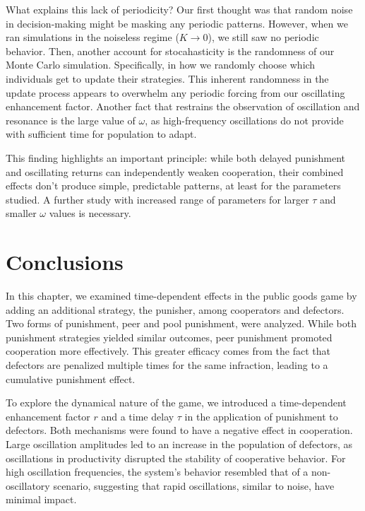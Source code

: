 What explains this lack of periodicity? Our first thought was that random noise in decision-making might be masking any periodic patterns. However, when we ran simulations in the noiseless regime ($K \to 0$), we still saw no periodic behavior. Then, another account for stocahasticity is the randomness of our Monte Carlo simulation. Specifically, in how we randomly choose which individuals get to update their strategies. This inherent randomness in the update process appears to overwhelm any periodic forcing from our oscillating enhancement factor. Another fact that restrains the observation of oscillation and resonance is the large value of $\omega$, as high-frequency oscillations do not provide with sufficient time for population to adapt. 

This finding highlights an important principle: while both delayed punishment and oscillating returns can independently weaken cooperation, their combined effects don't produce simple, predictable patterns, at least for the parameters studied. A further study with increased range of parameters for larger $\tau$ and smaller $\omega$ values is necessary.




\section{Conclusions }
\label{3Conclusions}


In this chapter, we examined time-dependent effects in the public goods game by adding an additional strategy, the punisher, among cooperators and defectors. Two forms of punishment, peer and pool punishment, were analyzed. While both punishment strategies yielded similar outcomes, peer punishment promoted cooperation more effectively. This greater efficacy comes from the fact that defectors are penalized multiple times for the same infraction, leading to a cumulative punishment effect.

To explore the dynamical nature of the game, we introduced a time-dependent enhancement factor $r$ and a time delay $\tau$ in the application of punishment to defectors. Both mechanisms were found to have a negative effect in cooperation. Large oscillation amplitudes led to an increase in the population of defectors, as oscillations in productivity disrupted the stability of cooperative behavior. For high oscillation frequencies, the system's behavior resembled that of a non-oscillatory scenario, suggesting that rapid oscillations, similar to noise, have minimal impact.

